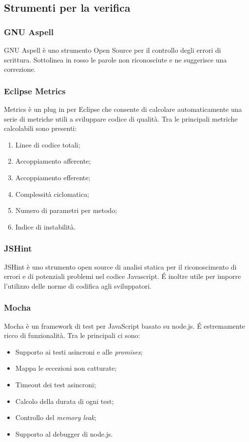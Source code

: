 \subsection{Strumenti per la verifica}

\subsubsection{GNU Aspell}
GNU Aspell è uno strumento Open Source per il controllo degli errori di scrittura. Sottolinea in rosso le parole non riconosciute e ne suggerisce una correzione.
\subsubsection{Eclipse Metrics}
Metrics è un plug in per Eclipse che consente di calcolare automaticamente una serie di metriche utili a sviluppare codice di qualità.
Tra le principali metriche calcolabili sono presenti:
\begin{enumerate}
\item Linee di codice totali;
\item Accoppiamento afferente;
\item Accoppiamento efferente;
\item Complessità ciclomatica;
\item Numero di parametri per metodo;
\item Indice di instabilità.
\end{enumerate}

\subsubsection{JSHint}
JSHint è uno strumento open source di analisi statica per il riconoscimento di errori e di potenziali problemi nel codice Javascript. \'E inoltre utile per imporre l'utilizzo delle norme di codifica agli sviluppatori.

\subsubsection{Mocha}
Mocha è un framework di test per  JavaScript basato su node.js. \'E estremamente ricco di funzionalità. Tra le principali ci sono:
\begin{itemize}
\item Supporto ai testi asincroni e alle \textit{promises};
\item Mappa le eccezioni non catturate;
\item Timeout dei test asincroni;
\item Calcolo della durata di ogni test;
\item Controllo del \textit{memory leak};
\item Supporto al debugger di node.js.
\end{itemize}

